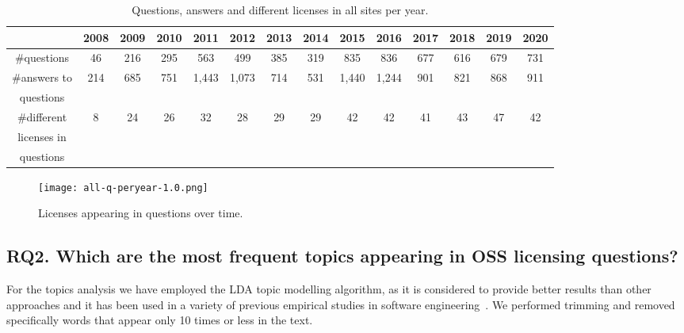 \documentclass{elsarticle}
\begin{document}
\begin{table}
  \caption{Questions, answers and different licenses in all sites per year.}
  \label{tab:dataset-size-peryear}
  \centering
  \begin{adjustbox}{width=0.99\textwidth}
  \begin{tabular}{cccccccccccccc}
    \hline
     & 2008 & 2009 & 2010 & 2011 & 2012 & 2013 & 2014 & 2015 & 2016 & 2017 & 2018 & 2019 & 2020\\
     \hline
    \#questions & 46& 216  & 295 & 563  &499 & 385 & 319 & 835 & 836&677 & 616 & 679& 731 \\
    \hline
    \#answers to & 214&  685 &  751&  1,443 & 1,073&  714&  531&  1,440& 1,244& 901& 821 & 868&  911 \\
    questions &\\
    \hline
    \#different  & 8 &24 &26 &32 &28 &29 &29 &42 &42 &41 &43 &47 &42 \\
    licenses in &\\
    questions &\\
  \hline
\end{tabular}
\end{adjustbox}
\end{table}

\begin{figure*}[!t]
\centering
\texttt{[image: all-q-peryear-1.0.png]}
\caption{Licenses appearing in questions over time.}
\label{fig:licenses-q-peryear}
\end{figure*}

\subsection{RQ2. Which are the most frequent topics appearing in OSS licensing questions?}

For the topics analysis we have employed the LDA topic modelling algorithm, as it is considered to provide better results than other approaches and it has been used in a variety of previous empirical studies in software engineering~\cite{blei2003latent,abdellatif2020challenges}. We performed trimming and removed specifically words that appear only 10 times or less in the text. 
\end{document}
